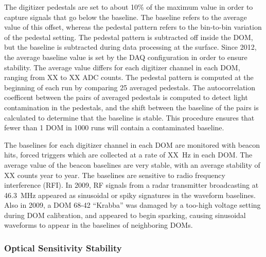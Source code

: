 The digitizer pedestals are set to about 10\% of the maximum value in
order to capture signals that go below the baseline. The baseline
refers to the average value of this offset, whereas the pedestal
pattern refers to the bin-to-bin variation of the pedestal
setting. The pedestal pattern is subtracted off inside the DOM, but
the baseline is subtracted during data processing at the
surface. Since 2012, the average
baseline value is set by the DAQ configuration in order to ensure
stability. The average value differs for each digitizer channel in
each DOM, ranging from XX to XX ADC counts. The pedestal pattern is computed at the beginning of each
run by comparing 25 averaged pedestals. The autocorrelation coefficent
between the pairs of averaged pedestals is computed to detect light
contamination in the pedestals, and the shift between the baseline of
the pairs is calculated to determine that the baseline is stable. This
procedure ensures that fewer than 1 DOM in 1000 runs will contain a
contaminated baseline.

The baselines for each digitizer channel in each DOM are monitored with
beacon hits, forced triggers which are collected at a rate of XX~Hz in
each DOM. The average value of the beacon baselines are very stable, with an average stability of
XX counts year to year. 
The baselines are sensitive to radio frequency interference (RFI). In
2009, RF signals from a radar transmitter broadcasting at 46.3~MHz
appeared as sinusoidal or spiky signatures in the waveform
baselines. Also in 2009, a DOM 68-42 ``Krabba'' was damaged by a too-high
voltage setting during DOM calibration, and appeared to begin
sparking, causing sinusoidal waveforms to appear in the baselines of
neighboring DOMs.

\subsubsection{Optical Sensitivity Stability}

